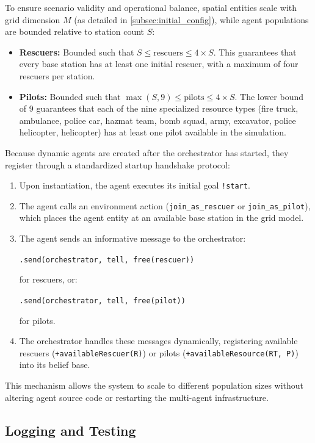 To ensure scenario validity and operational balance, spatial entities scale with grid dimension $M$ (as detailed in \cref{subsec:initial_config}), while agent populations are bounded relative to station count $S$:
\begin{itemize}
    \item \textbf{Rescuers:} Bounded such that $S \le \mathrm{rescuers} \le 4 \times S$. This guarantees that every base station has at least one initial rescuer, with a maximum of four rescuers per station.
    \item \textbf{Pilots:} Bounded such that $\max(S, 9) \le \mathrm{pilots} \le 4 \times S$. The lower bound of 9 guarantees that each of the nine specialized resource types (fire truck, ambulance, police car, hazmat team, bomb squad, army, excavator, police helicopter, helicopter) has at least one pilot available in the simulation.
\end{itemize}

Because dynamic agents are created after the orchestrator has started, they register through a standardized startup handshake protocol:
\begin{enumerate}
    \item Upon instantiation, the agent executes its initial goal \texttt{!start}.
    \item The agent calls an environment action (\texttt{join\_as\_rescuer} or \texttt{join\_as\_pilot}), which places the agent entity at an available base station in the grid model.
    \item The agent sends an informative message to the orchestrator:
    \begin{center}
    \texttt{.send(orchestrator, tell, free(rescuer))}
    \end{center}
    for rescuers, or:
    \begin{center}
    \texttt{.send(orchestrator, tell, free(pilot))}
    \end{center}
    for pilots.
    \item The orchestrator handles these messages dynamically, registering available rescuers (\texttt{+availableRescuer(R)}) or pilots (\texttt{+availableResource(RT, P)}) into its belief base.
\end{enumerate}

This mechanism allows the system to scale to different population sizes without altering agent source code or restarting the multi-agent infrastructure.

\subsection{Logging and Testing}\label{subsec:impl_view}

